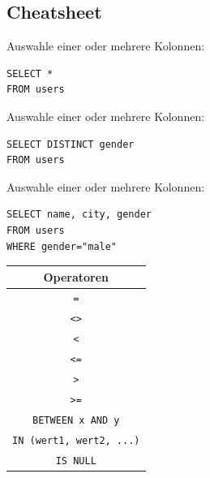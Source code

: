 \thispagestyle{empty}
\footnotesize

\begin{landscape}
\begin{center}
\section*{Cheatsheet}
\end{center}
\begin{multicols*}{4}

\begin{tcolorboxTemplate}[title=Einfache Selektion: \texorpdfstring{\lstinline[style=sql]|SELECT|}{SELECT},colbacktitle=white, coltitle=black]
Auswahle einer oder mehrere Kolonnen:
\begin{lstlisting}[style=sql]
SELECT *
FROM users
\end{lstlisting}
\end{tcolorboxTemplate}

\begin{tcolorboxTemplate}[title=Duplikate entfernen: \texorpdfstring{\lstinline[style=sql]|SELECT DISTINCT|}{SELECT DISTINCT},colbacktitle=white, coltitle=black]
Auswahle einer oder mehrere Kolonnen:
\begin{lstlisting}[style=sql]
SELECT DISTINCT gender
FROM users
\end{lstlisting}
\end{tcolorboxTemplate}

\begin{tcolorboxTemplate}[title=Filter: \texorpdfstring{\lstinline[style=sql]|WHERE|}{WHERE},colbacktitle=white, coltitle=black]
Auswahle einer oder mehrere Kolonnen:
\begin{lstlisting}[style=sql]
SELECT name, city, gender
FROM users
WHERE gender="male"
\end{lstlisting}

\begin{table}[H]
\footnotesize
  \centering
  \begin{tabular}{c}
    \textbf{Operatoren} \\\midrule
    \texttt{=}                                    \\
    \texttt{<>}                                   \\
    \texttt{<}                                    \\
    \texttt{<=}                                   \\
    \texttt{>}                                    \\
    \texttt{>=}                                   \\
    \lstinline[style=sql]|BETWEEN x AND y|        \\
    \lstinline[style=sql]|IN (wert1, wert2, ...)| \\
    \lstinline[style=sql]|IS NULL|                \\
  \end{tabular}
\end{table}
\end{tcolorboxTemplate}


\end{multicols*}
\end{landscape}
